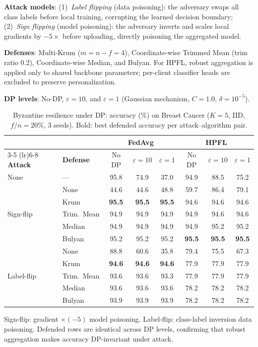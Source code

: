 \documentclass[conference,a4paper]{IEEEtran}
\begin{document}
\textbf{Attack models}: (1)~\textit{Label flipping} (data poisoning): the adversary swaps all class labels before local training, corrupting the learned decision boundary; (2)~\textit{Sign flipping} (model poisoning): the adversary inverts and scales local gradients by $-5\times$ before uploading, directly poisoning the aggregated model.

\textbf{Defenses}: Multi-Krum ($m{=}n{-}f{=}4$), Coordinate-wise Trimmed Mean (trim ratio 0.2), Coordinate-wise Median, and Bulyan. For HPFL, robust aggregation is applied only to shared backbone parameters; per-client classifier heads are excluded to preserve personalization.

\textbf{DP levels}: No-DP, $\varepsilon{=}10$, and $\varepsilon{=}1$ (Gaussian mechanism, $C{=}1.0$, $\delta{=}10^{-5}$).

\begin{table}[htbp]
\centering
\caption{Byzantine resilience under DP: accuracy (\%) on Breast Cancer ($K{=}5$, IID, $f/n{=}20\%$, 3 seeds). Bold: best defended accuracy per attack--algorithm pair.}
\label{tab:byzantine_dp}
\small
\begin{tabular}{ll ccc ccc}
\toprule
& & \multicolumn{3}{c}{\textbf{FedAvg}} & \multicolumn{3}{c}{\textbf{HPFL}} \\
\cmidrule(lr){3-5} \cmidrule(lr){6-8}
\textbf{Attack} & \textbf{Defense} & No DP & $\varepsilon{=}10$ & $\varepsilon{=}1$ & No DP & $\varepsilon{=}10$ & $\varepsilon{=}1$ \\
\midrule
None & --- & 95.8 & 74.9 & 37.0 & 94.9 & 88.5 & 75.2 \\
\midrule
\multirow{5}{*}{Sign-flip}
 & None & 44.6 & 44.6 & 48.8 & 59.7 & 86.4 & 79.1 \\
 & Krum & \textbf{95.5} & \textbf{95.5} & \textbf{95.5} & 94.6 & 94.6 & 94.6 \\
 & Trim.\ Mean & 94.9 & 94.9 & 94.9 & 94.9 & 94.6 & 94.6 \\
 & Median & 94.9 & 94.9 & 94.9 & 94.9 & 95.2 & 95.2 \\
 & Bulyan & 95.2 & 95.2 & 95.2 & \textbf{95.5} & \textbf{95.5} & \textbf{95.5} \\
\midrule
\multirow{5}{*}{Label-flip}
 & None & 88.8 & 60.6 & 35.8 & 79.4 & 75.5 & 67.3 \\
 & Krum & \textbf{94.6} & \textbf{94.6} & \textbf{94.6} & 77.9 & 77.9 & 77.9 \\
 & Trim.\ Mean & 93.6 & 93.6 & 93.3 & 77.9 & 77.9 & 77.9 \\
 & Median & 93.6 & 93.6 & 93.6 & 78.2 & 78.2 & 78.2 \\
 & Bulyan & 93.9 & 93.9 & 93.9 & 78.2 & 78.2 & 78.2 \\
\bottomrule
\end{tabular}

\vspace{1mm}
\footnotesize{Sign-flip: gradient $\times (-5)$ model poisoning. Label-flip: class-label inversion data poisoning. Defended rows are identical across DP levels, confirming that robust aggregation makes accuracy DP-invariant under attack.}
\end{table}
\end{document}
